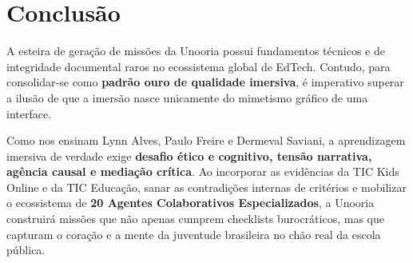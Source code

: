 \documentclass[11pt,a4paper]{article}
\begin{document}
\section{Conclus\~ao}

A esteira de gera\c{c}\~ao de miss\~oes da Unooria possui fundamentos t\'ecnicos e de integridade documental raros no ecossistema global de EdTech. Contudo, para consolidar-se como \textbf{padr\~ao ouro de qualidade imersiva}, \'e imperativo superar a ilus\~ao de que a imers\~ao nasce unicamente do mimetismo gr\'afico de uma interface.

Como nos ensinam Lynn Alves, Paulo Freire e Dermeval Saviani, a aprendizagem imersiva de verdade exige \textbf{desafio \'etico e cognitivo, tens\~ao narrativa, ag\^encia causal e media\c{c}\~ao cr\'itica}. Ao incorporar as evid\^encias da TIC Kids Online e da TIC Educa\c{c}\~ao, sanar as contradi\c{c}\~oes internas de crit\'erios e mobilizar o ecossistema de \textbf{20 Agentes Colaborativos Especializados}, a Unooria construir\'a miss\~oes que n\~ao apenas cumprem checklists burocr\'aticos, mas que capturam o cora\c{c}\~ao e a mente da juventude brasileira no ch\~ao real da escola p\'ublica.
\end{document}
